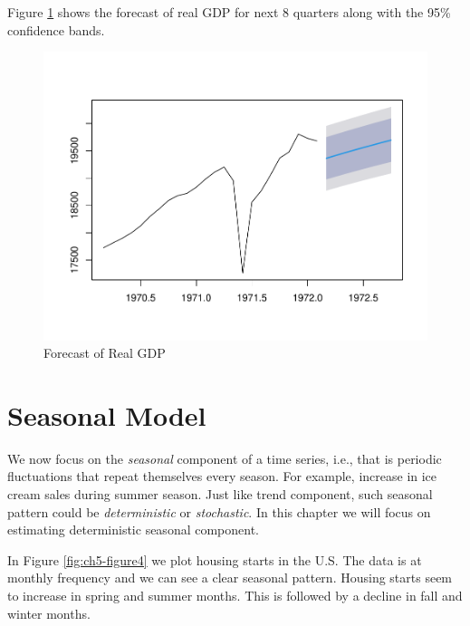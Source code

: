 \documentclass[]{book}
\theoremstyle{definition}
\theoremstyle{definition}
\theoremstyle{definition}
\theoremstyle{remark}
\begin{document}
Figure \ref{fig:ch5-figure3} shows the forecast of real GDP for next 8
quarters along with the 95\% confidence bands.

\begin{figure}

{\centering \includegraphics[width=0.8\linewidth]{bookdown-demo_files/figure-latex/ch5-figure3-1} 

}

\caption{Forecast of Real GDP}\label{fig:ch5-figure3}
\end{figure}

\hypertarget{seasonal-model}{%
\section{Seasonal Model}\label{seasonal-model}}

We now focus on the \emph{seasonal} component of a time series, i.e.,
that is periodic fluctuations that repeat themselves every season. For
example, increase in ice cream sales during summer season. Just like
trend component, such seasonal pattern could be \emph{deterministic} or
\emph{stochastic}. In this chapter we will focus on estimating
deterministic seasonal component.

In Figure \ref{fig:ch5-figure4} we plot housing starts in the U.S. The
data is at monthly frequency and we can see a clear seasonal pattern.
Housing starts seem to increase in spring and summer months. This is
followed by a decline in fall and winter months.
\end{document}
